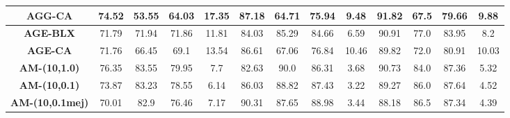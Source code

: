 \documentclass[11pt,a4paper]{article}
\begin{document}
\begin{table}[H]
{\begin{tabular}{c|c|c|c|c|c|c|c|c|c|c|c|c|}
\multicolumn{1}{|c|}{\textbf{AGG-CA}}                                                          & 74.52                      & 53.55                   & 64.03                  & 17.35             & 87.18                      & 64.71                   & 75.94                  & 9.48              & 91.82                      & 67.5                    & 79.66                  & 9.88             \\ \hline
\multicolumn{1}{|c|}{\textbf{AGE-BLX}}                                                         & 71.79                      & 71.94                   & 71.86                  & 11.81             & 84.03                      & 85.29                   & 84.66                  & 6.59              & 90.91                      & 77.0                    & 83.95                  & 8.2              \\ \hline
\multicolumn{1}{|c|}{\textbf{AGE-CA}}                                                          & 71.76                      & 66.45                   & 69.1                   & 13.54             & 86.61                      & 67.06                   & 76.84                  & 10.46             & 89.82                      & 72.0                    & 80.91                  & 10.03            \\ \hline
\multicolumn{1}{|c|}{\textbf{AM-(10,1.0)}}                                                     & 76.35                      & 83.55                   & 79.95                  & 7.7               & 82.63                      & 90.0                    & 86.31                  & 3.68              & 90.73                      & 84.0                    & 87.36                  & 5.32             \\ \hline
\multicolumn{1}{|c|}{\textbf{AM-(10,0.1)}}                                                     & 73.87                      & 83.23                   & 78.55                  & 6.14              & 86.03                      & 88.82                   & 87.43                  & 3.22              & 89.27                      & 86.0                    & 87.64                  & 4.52             \\ \hline
\multicolumn{1}{|c|}{\textbf{AM-(10,0.1mej)}}                                                  & 70.01                      & 82.9                    & 76.46                  & 7.17              & 90.31                      & 87.65                   & 88.98                  & 3.44              & 88.18                      & 86.5                    & 87.34                  & 4.39             \\ \hline

\end{tabular}}
\end{table}
\end{document}
